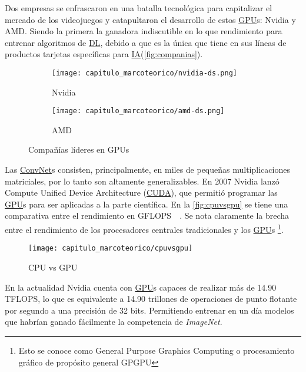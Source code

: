 Dos empresas se enfrascaron en una batalla tecnológica para capitalizar el
mercado de los videojuegos y catapultaron el desarrollo de estos
\hyperlink{abbr}{GPU}s: Nvidia y AMD. Siendo la primera la ganadora indiscutible
en lo que rendimiento para entrenar algoritmos de \hyperlink{abbr}{DL}, debido a
que es la única que tiene en sus líneas de productos tarjetas específicas para
\hyperlink{abbr}{IA}(\autoref{fig:companias}).


\begin{figure}[H]
    \centering
    \begin{subfigure}{.5\textwidth}
      \centering
      \texttt{[image: capitulo\_marcoteorico/nvidia-ds.png]}
      \caption{Nvidia}\label{fig:Nvidia}
    \end{subfigure}%
    \begin{subfigure}{.5\textwidth}
      \centering
      \texttt{[image: capitulo\_marcoteorico/amd-ds.png]}
      \caption{AMD}\label{fig:AMD}
    \end{subfigure}
    \caption{Compañías líderes en GPUs}\label{fig:companias}
    \end{figure}

Las \hyperlink{abbr}{ConvNet}s consisten, principalmente, en miles de pequeñas
multiplicaciones matriciales, por lo tanto son altamente generalizables. En 2007
Nvidia lanzó Compute Unified Device Architecture
(\hyperlink{abbr}{CUDA}), que permitió programar las \hyperlink{abbr}{GPU}s para ser
aplicadas a la parte científica. En la \autoref{fig:cpuvsgpu} se tiene una
comparativa entre el rendimiento en GFLOPS~\cite{Nvidia}~\cite{Nvidiaa}. Se nota
claramente la brecha entre el rendimiento de los procesadores centrales
tradicionales y los \hyperlink{abbr}{GPU}s \footnote{Esto se conoce como General
Purpose Graphics Computing o procesamiento gráfico de propósito general GPGPU}.

\begin{figure}[H]
    \centering
    \texttt{[image: capitulo\_marcoteorico/cpuvsgpu]}
    \caption{CPU vs GPU}\label{fig:cpuvsgpu}
\end{figure}

En la actualidad Nvidia cuenta con \hyperlink{abbr}{GPU}s capaces de realizar
más de 14.90 TFLOPS, lo que es equivalente a 14.90 trillones de operaciones de
punto flotante por segundo a una precisión de 32 bits. Permitiendo entrenar en
un día modelos que habrían ganado fácilmente la competencia de \emph{ImageNet}.

